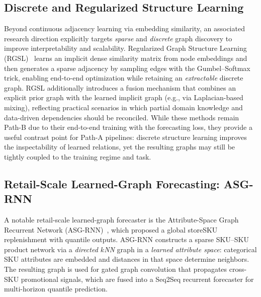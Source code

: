 \subsection{Discrete and Regularized Structure Learning}
\label{sec:pathb-discrete-regularized}

Beyond continuous adjacency learning via embedding similarity, an associated research direction explicitly targets
\emph{sparse} and \emph{discrete} graph discovery to improve interpretability and scalability. Regularized Graph Structure Learning (RGSL)~\cite{Yu20222362} learns an implicit dense similarity matrix from node embeddings and then generates a sparse adjacency by sampling edges with the Gumbel--Softmax trick, enabling end-to-end optimization while retaining an \emph{extractable} discrete graph. RGSL additionally introduces a fusion mechanism that combines an explicit prior graph with the learned implicit graph (e.g., via Laplacian-based mixing), reflecting practical scenarios in which partial domain knowledge and data-driven dependencies should be reconciled. While these methods remain Path-B due to their end-to-end training with the forecasting loss, they provide a useful contrast point for Path-A pipelines: discrete structure learning improves the inspectability of learned relations, yet the resulting graphs may still be tightly coupled to the training regime and task.

\subsection{Retail-Scale Learned-Graph Forecasting: ASG-RNN}
\label{sec:pathb-asg-rnn}

A notable retail-scale learned-graph forecaster is the Attribute-Space Graph Recurrent Network (ASG-RNN)~\cite{MA2024123727}, which proposed a global storeSKU replenishment with quantile outputs. ASG-RNN constructs a sparse SKU--SKU product network via a
\emph{directed $k$NN} graph in a \emph{learned attribute space}: categorical SKU attributes are embedded and distances in that space determine neighbors. The resulting graph is used for gated graph convolution that propagates cross-SKU promotional signals, which are fused into a Seq2Seq recurrent forecaster for multi-horizon quantile prediction.

